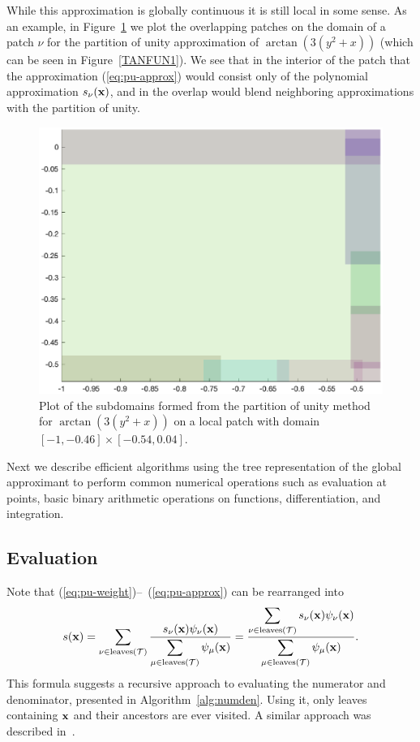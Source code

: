  While this approximation is globally continuous it is still local in some sense. As an example, in Figure~\ref{overlap_plot} we plot the overlapping patches on the domain of a patch $\nu$ for the partition of unity approximation of $\arctan(3(y^2+x))$ (which can be seen in Figure~\ref{TANFUN1}). We see that in the interior of the patch that the approximation (\ref{eq:pu-approx}) would consist only of the polynomial approximation $s_\nu(\mathbf{x})$, and in the overlap would blend neighboring approximations with the partition of unity.


\begin{figure}
\centering
\includegraphics[scale = 0.5]{Chapter2/overlap.eps}
\caption{Plot of the subdomains formed from the partition of unity method for $\arctan(3(y^2+x))$ on a local patch with domain $[-1 , -0.46] \times [-0.54 , 0.04]$.}
\label{overlap_plot}
\end{figure}

Next we describe efficient algorithms using the tree representation of the global approximant to perform common numerical operations such as evaluation at points, basic binary arithmetic operations on functions, differentiation, and integration.

\subsection{Evaluation}

Note that (\ref{eq:pu-weight})--~(\ref{eq:pu-approx}) can be rearranged into
\begin{equation}
  s(\mathbf{x}) = \sum_{\nu\in \text{leaves}(\mathcal{T})} \frac{s_\nu(\mathbf{x}) \psi_\nu(\mathbf{x})}{\displaystyle \sum_{\mu\in \text{leaves}(\mathcal{T})} \psi_\mu(\mathbf{x})}
  = \frac{\displaystyle\sum_{\nu\in \text{leaves}(\mathcal{T})} s_\nu(\mathbf{x}) \psi_\nu(\mathbf{x})}{\displaystyle \sum_{\mu\in \text{leaves}(\mathcal{T})} \psi_\mu(\mathbf{x})}.
  \label{eq:pu-alt}
\end{equation}
This formula suggests a recursive approach to evaluating the numerator and denominator, presented in Algorithm~\ref{alg:numden}. Using it, only leaves containing $\mathbf{x}$ and their ancestors are ever visited. A similar approach was described in~\cite{tobor2006reconstructing}.

